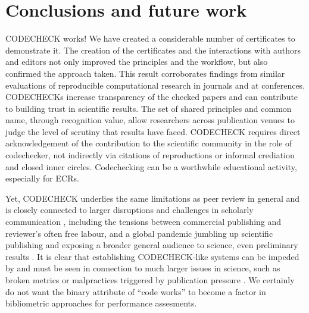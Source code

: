 \documentclass[12pt]{article}
\begin{document}
\section*{Conclusions and future work}\label{future-work-and-conclusions}

CODECHECK works!
We have created a considerable number of certificates to demonstrate it.
The creation of the certificates and the interactions with authors and
editors not only improved the principles and the workflow, but also
confirmed the approach taken. This result corroborates findings from
similar evaluations of reproducible computational research in journals and
at conferences.
CODECHECKs increase transparency of the checked papers and can contribute
to building trust in scientific results.
The set of 
shared principles and common name, through recognition value,
allow researchers
across publication venues to judge the level of scrutiny that results have
faced. CODECHECK requires direct acknowledgement of the contribution to the
scientific community in the role of codechecker, not indirectly via citations 
of reproductions or informal crediation and closed inner circles.
Codechecking can be a worthwhile educational activity, especially for
ECRs.

Yet, CODECHECK underlies the same limitations as peer review
in general and is closely connected to larger disruptions and challenges
in scholarly communication
\cite{eglen_recent_2018,tennant_ten_2019,fyfe_mission_2019}, 
including the tensions between commercial publishing and reviewer's often
free labour, and a global pandemic jumbling up scientific publishing
and exposing a broader general audience to science, even preliminary 
results \cite{munafo_what_2020}.
It is clear that establishing CODECHECK-like systems can be 
impeded by and must be seen in connection to much larger issues in 
science, such as broken metrics or malpractices triggered by publication
pressure \cite{piwowar_altmetrics:_2013,nosek_promoting_2015}.
We certainly do not want the binary attribute of ``code works''
to become a factor in bibliometric approaches for performance assesments.
\end{document}
